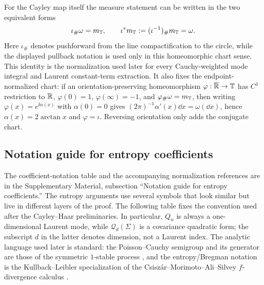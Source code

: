 \begin{remark}\label{rem:haar-pullback-normalization}
For the Cayley map itself the measure statement can be written in the two
equivalent forms
\begin{equation}\label{eq:haar-pullback}
\iota_{\#}\omega=m_{\mathbb{T}},
\qquad
\iota^{*}m_{\mathbb{T}}:=(\iota^{-1})_{\#}m_{\mathbb{T}}=\omega.
\end{equation}
Here \(\iota_{\#}\) denotes pushforward from the line compactification to
the circle, while the displayed pullback notation is used only in this
homeomorphic chart sense.
This identity is the normalization used later for every Cauchy-weighted
mode integral and Laurent constant-term extraction.  It also fixes the
endpoint-normalized chart: if an orientation-preserving homeomorphism
\(\varphi:\overline{\mathbb{R}}\to\mathbb{T}\) has \(C^1\) restriction to \(\mathbb{R}\),
\(\varphi(0)=1\), \(\varphi(\infty)=-1\), and
\(\varphi_{\#}\omega=m_{\mathbb{T}}\), then writing
\(\varphi(x)=e^{\ii\alpha(x)}\) with \(\alpha(0)=0\) gives
\((2\pi)^{-1}\alpha'(x)\dd x=\omega(\dd x)\), hence
\(\alpha(x)=2\arctan x\) and \(\varphi=\iota\).  Reversing orientation only
adds the conjugate chart.
\end{remark}

\subsection*{Notation guide for entropy coefficients}
\label{subsec:notation-guide-entropy}

\ifdefined\JFAArticleMain
The coefficient-notation table and the accompanying normalization references
are in the Supplementary Material, subsection ``Notation guide for entropy
coefficients.''
\else
The entropy arguments use several symbols that look similar but live in
different layers of the proof.  The following table fixes the convention used
after the Cayley--Haar preliminaries.  In particular, \(Q_n\) is always a
one-dimensional Laurent mode, while \(\mathcal Q_d(\Sigma)\) is a covariance
quadratic form; the subscript \(d\) in the latter denotes dimension, not a
Laurent index.
The analytic language used later is standard: the Poisson--Cauchy semigroup
and its generator are those of the symmetric \(1\)-stable process
\cite{Feller1971,Bertoin1996LevyProcesses,Sato1999LevyProcesses,
Applebaum2009LevyProcesses,Kwasnicki2017}, and the entropy/Bregman notation is
the Kullback--Leibler specialization of the Csisz{\'a}r--Morimoto--Ali--Silvey
\(f\)-divergence calculus
\cite{KullbackLeibler1951,AliSilvey1966Divergence,Csiszar1967,
Morimoto1963Markov,Vajda1989TheoryDivergence,CoverThomas2006,Bregman1967}.

